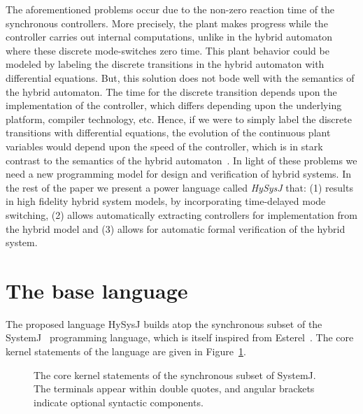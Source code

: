 \documentclass[10pt,journal,cspaper,compsoc]{IEEEtran}
\begin{document}
The aforementioned problems occur due to the non-zero reaction time of
the synchronous controllers. More precisely, the plant makes progress
while the controller carries out internal computations, unlike in the
hybrid automaton where these discrete mode-switches zero time. This
plant behavior could be modeled by labeling the discrete transitions in
the hybrid automaton with differential equations. But, this solution
does not bode well with the semantics of the hybrid automaton. The time
for the discrete transition depends upon the implementation of the
controller, which differs depending upon the underlying platform,
compiler technology, etc. Hence, if we were to simply label the discrete
transitions with differential equations, the evolution of the continuous
plant variables would depend upon the speed of the controller, which is
in stark contrast to the semantics of the hybrid
automaton~\cite{Henzinger:1996:THA:788018.788803}. In light of these
problems we need a new programming model for design and verification of
hybrid systems. In the rest of the paper we present a power language
called \textit{HySysJ} that: (1) results in high fidelity hybrid system
models, by incorporating time-delayed mode switching, (2) allows
automatically extracting controllers for implementation from the hybrid
model and (3) allows for automatic formal verification of the hybrid
system.





\section{The base language}
\label{sec:base-language}

The proposed language HySysJ builds atop the synchronous subset of the
SystemJ~\cite{amal10} programming language, which is itself inspired
from Esterel~\cite{berry96}. The core kernel statements of the language
are given in Figure~\ref{fig:5}.

\begin{figure}[t!]
  \centering
   
   \caption{The core kernel statements of the synchronous subset of
     SystemJ. The terminals appear within double quotes, and angular
     brackets indicate optional syntactic components.}
  \label{fig:5}
\end{figure}
\end{document}
